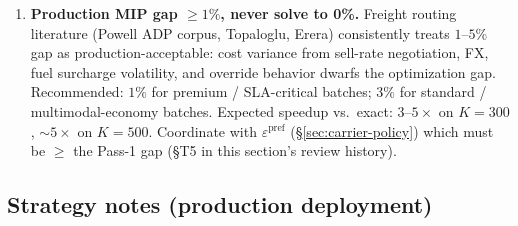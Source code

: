 \documentclass[11pt,a4paper]{article}
\theoremstyle{definition}
\begin{document}
\begin{enumerate}
  \item \label{item:scale-mip-gap} \textbf{Production MIP gap $\geq 1\%$, never solve to 0\%.}
        Freight routing literature (Powell ADP corpus, Topaloglu, Erera) consistently
        treats $1$--$5\%$ gap as production-acceptable: cost variance from sell-rate
        negotiation, FX, fuel surcharge volatility, and override behavior dwarfs the
        optimization gap. Recommended: $1\%$ for premium / SLA-critical batches; $3\%$
        for standard / multimodal-economy batches. Expected speedup vs.\ exact: $3$--$5\times$
        on $K=300$, $\sim$$5\times$ on $K=500$. Coordinate with
        $\varepsilon^{\text{pref}}$ (\S\ref{sec:carrier-policy}) which must be $\geq$
        the Pass-1 gap (\S T5 in this section's review history).
\end{enumerate}

\subsection*{Strategy notes (production deployment)}
\end{document}
